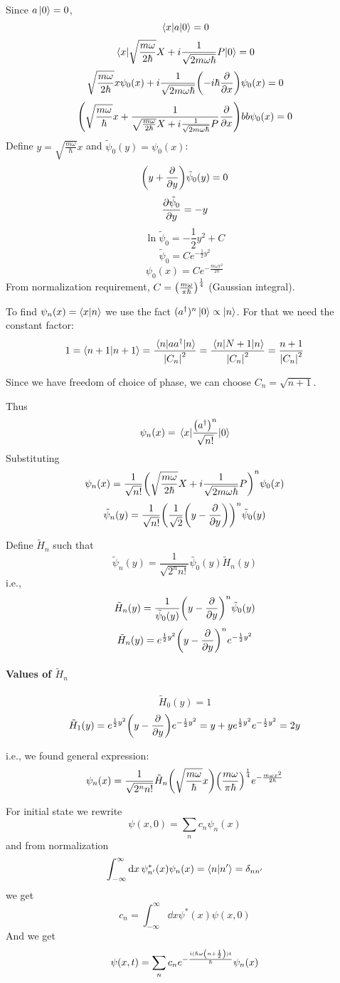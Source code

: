 Since $a\ket{0}=0$,
$$\mel{x}{a}{0} = 0$$
$$\mel{x}{\sqrt{\frac{m\omega}{2\hbar}} X +i\frac{1}{\sqrt{2m\omega\hbar}} P}{0} = 0$$
$$\sqrt{\frac{m\omega}{2\hbar}}x\psi_0(x) +i\frac{1}{\sqrt{2m\omega\hbar}} \qty(-i\hbar \pdv{x}) \psi_0(x)= 0$$
$$\qty(\sqrt{\frac{m\omega}{\hbar}} x + \frac{1}{\sqrt{\frac{m\omega}{2\hbar}} X +i\frac{1}{\sqrt{2m\omega\hbar}} P}\pdv{x})bb\psi_0(x) = 0$$
Define $y=\sqrt{\frac{m\omega}{\hbar}}x$ and $\tilde{\psi}_0(y) = \psi_0(x)$:
$$\qty(y+\pdv{y}) \tilde{\psi}_0(y) = 0$$
$$\pdv{\tilde{\psi}_0}{y} = -y$$
$$\ln \tilde{\psi}_0 = -\frac{1}{2} y^2 + C$$
$$\tilde{\psi}_0 = C e^{-\frac{1}{2} y^2 }$$
$$\psi_0(x)  = C e^{-\frac{m\omega x^2}{2\hbar}}$$
From normalization requirement, $C = \qty(\frac{m\omega}{\pi \hbar})^{\frac{1}{4}}$ (Gaussian integral).

To find $\psi_n(x) = \braket{x}{n}$ we use the fact $(a^\dagger)^n \ket{0} \propto \ket{n}$.
For that we need the constant  factor:
$$1 = \braket{n+1}{n+1} = \frac{\mel{n}{aa^\dagger}{n}}{\abs{C_n}^2} = \frac{\mel{n}{N+1}{n}}{\abs{C_n}^2} = \frac{n+1}{\abs{C_n}^2}  $$

Since we have freedom of choice of phase, we can choose $C_n = \sqrt{n+1}$.

Thus
$$\psi_n(x) = \mel{x}{\frac{\qty(a^\dagger)^n}{\sqrt{n!}}}{0}$$
Substituting
$$\psi_n(x) =\frac{1}{\sqrt{n!}}\qty(\sqrt{\frac{m\omega}{2\hbar}} X +i\frac{1}{\sqrt{2m\omega\hbar}} P)^n \psi_0(x)$$
$$\tilde{\psi}_n(y) = \frac{1}{\sqrt{n!}} \qty(\frac{1}{\sqrt{2}}\qty(y-\pdv{y}))^n \tilde{\psi}_0(y)$$

Define $\tilde{H}_n$ such that
$$\tilde{\psi}_n(y) = \frac{1}{\sqrt{2^nn!}} \tilde{\psi_0}(y) \tilde{H}_n(y)$$
i.e.,
$$\tilde{H}_n(y) = \frac{1}{\tilde{\psi}_0(y)} \qty(y-\pdv{y})^n\tilde{\psi}_0(y)$$
$$\tilde{H}_n(y) = e^{\frac{1}{2}y^2} \qty(y-\pdv{y})^n  e^{-\frac{1}{2}y^2} $$

\paragraph{Values of $\tilde{H}_n$}
$$\tilde{H}_0(y) = 1$$
$$\tilde{H}_1(y) = e^{\frac{1}{2}y^2} \qty(y-\pdv{y})  e^{-\frac{1}{2}y^2} = y + y e^{\frac{1}{2}y^2}e^{-\frac{1}{2}y^2} = 2y $$

i.e., we found general expression:
$$\psi_n(x) = \frac{1}{\sqrt{2^nn!}} \tilde{H}_n\qty(\sqrt{\frac{m\omega}{\hbar}}x)\qty(\frac{m\omega}{\pi \hbar})^{\frac{1}{4}}e^{-\frac{m\omega x^2}{2\hbar}}$$

For initial state we rewrite
$$\psi(x,0) = \sum_n c_n \psi_n(x)$$
and from normalization
$$\int_{-\infty}^{\infty} \dd{x} \psi^*_{n'} (x) \psi_n(x)  = \braket{n}{n'} = \delta_{nn'}$$
we get
$$c_n = \int_{-\infty}^\infty \dd{x} \psi^*(x) \psi(x,0)  $$
And we get
$$\psi(x,t) = \sum_n c_n e^{-\frac{i(\hbar \omega \qty(n+\frac{1}{2}))t}{\hbar}} \psi_n(x)$$